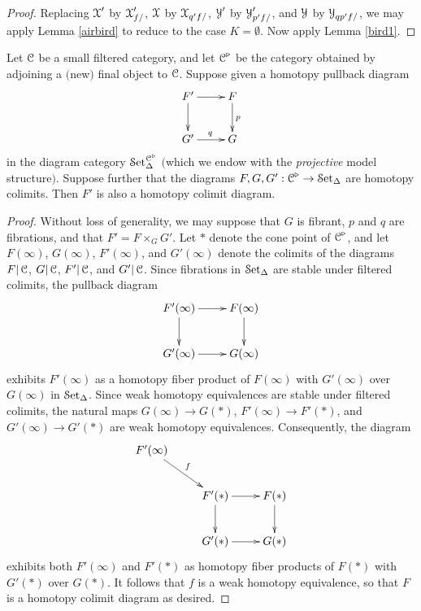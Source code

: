 \begin{proof}
Replacing $\operatorname{\mathcal{X}}'$ by $\operatorname{\mathcal{X}}'_{f/}$,
$\operatorname{\mathcal{X}}$ by $\operatorname{\mathcal{X}}_{q'  f/}$, $\operatorname{\mathcal{Y}}'$ by $\operatorname{\mathcal{Y}}'_{p'  f/}$, and $\operatorname{\mathcal{Y}}$ by
$\operatorname{\mathcal{Y}}_{q  p'  f/}$, we may apply Lemma \ref{airbird} to reduce to the case $K = \emptyset$. Now apply Lemma \ref{bird1}.
\end{proof}

\begin{lemma}\label{filterprod}
Let $\operatorname{\mathcal{C}}$ be a small filtered category, and let $\operatorname{\mathcal{C}}^{\triangleright}$ be the category
obtained by adjoining a $($new$)$ final object to $\operatorname{\mathcal{C}}$.
Suppose given a homotopy pullback diagram
$$ \xymatrix{ F' \ar[r] \ar[d] & F \ar[d]^{p} \\
G' \ar[r]^{q} & G }$$
in the diagram category $\operatorname{\mathcal{S}et}_{\Delta}^{\operatorname{\mathcal{C}}^{\triangleright}}$ $($which we endow with the {\it projective}
model structure$)$. Suppose further that the diagrams $F, G, G': \operatorname{\mathcal{C}}^{\triangleright} \rightarrow \operatorname{\mathcal{S}et_{\Delta}}$ are homotopy colimits. Then $F'$ is also a homotopy colimit diagram.
\end{lemma}

\begin{proof}
Without loss of generality, we may suppose that $G$ is fibrant, $p$ and $q$ are fibrations, and that
$F' = F \times_{G} G'$. Let $\ast$ denote the cone point of $\operatorname{\mathcal{C}}^{\triangleright}$, and let
$F(\infty)$, $G(\infty)$, $F'(\infty)$, and $G'(\infty)$ denote the colimits of the diagrams
$F|\operatorname{\mathcal{C}}$, $G|\operatorname{\mathcal{C}}$, $F'| \operatorname{\mathcal{C}}$, and $G'| \operatorname{\mathcal{C}}$. Since fibrations in $\operatorname{\mathcal{S}et_{\Delta}}$ are stable under filtered colimits, the pullback diagram
$$ \xymatrix{ F'(\infty) \ar[r] \ar[d] & F(\infty) \ar[d] \\
G'(\infty) \ar[r] & G(\infty) }$$
exhibits $F'(\infty)$ as a homotopy fiber product of $F(\infty)$ with $G'(\infty)$ over
$G(\infty)$ in $\operatorname{\mathcal{S}et_{\Delta}}$. 
Since weak homotopy equivalences are stable under filtered colimits, the natural maps $G(\infty) \rightarrow G(\ast)$, $F'(\infty) \rightarrow F'(\ast)$, and $G'(\infty) \rightarrow G'(\ast)$ are weak homotopy equivalences. Consequently, the diagram
$$ \xymatrix{ F'(\infty) \ar[dr]^{f} & & \\
& F'(\ast) \ar[r] \ar[d] & F(\ast) \ar[d] \\
& G'(\ast) \ar[r] & G(\ast) }$$
exhibits both $F'(\infty)$ and $F'(\ast)$ as homotopy fiber products of $F(\ast)$ with
$G'(\ast)$ over $G(\ast)$. It follows that $f$ is a weak homotopy equivalence, so that $F$ is a homotopy colimit diagram as desired.
\end{proof}

